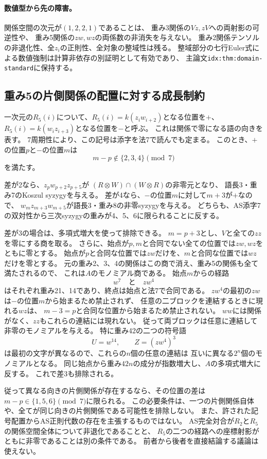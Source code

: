 \documentclass[11pt,a4paper]{ltjsarticle}
\begin{document}
\paragraph{数値型から先の障害。}
関係空間の次元が$(1,2,2,1)$であることは、
重み3関係の$Vz,zV$への両射影の可逆性や、
重み5関係の$zw,wz$の両係数の非消失を与えない。
重み2関係テンソルの非退化性、全$z_i$の正則性、全対象の整域性は残る。
整域部分の七行Euler式による数値強制は計算非依存の別証明として有効であり、
主論文\texttt{idx:thm:domain-standard}に保持する。

\subsection{重み5の片側関係の配置に対する成長制約}
\label{note:r5-orientation}
一次元の$R_5(i)$について、$R_5(i)=k(z_iw_{i+2})$となる位置を$+$、
$R_5(i)=k(w_iz_{i+3})$となる位置を$-$と呼ぶ。
これは関係で零になる語の向きを表す。
7周期性により、この記号は添字を法7で読んでも定まる。
このとき、$+$の位置$p$と$-$の位置$m$は
\[
m-p\notin\{2,3,4\}\pmod7
\]
を満たす。

差が2なら、$z_pw_{p+2}z_{p+5}$が
$(R\otimes W)\cap(W\otimes R)$の非零元となり、
語長3・重み7のKoszul syzygyを与える。
差が4なら、$-$の位置$m$に対して$m+3$が$+$なので、
$w_mz_{m+3}w_{m+5}$が語長3・重み8の非零syzygyを与える。
どちらも、AS添字7の双対性から三次syzygyの重みが4、5、6に限られることに反する。

差が3の場合は、多項式増大を使って排除できる。
$m=p+3$とし、$V$と全ての$zz$を零にする商を取る。
さらに、始点が$p,m$と合同でない全ての位置では$zw,wz$をともに零とする。
始点が$p$と合同な位置では$zw$だけを、$m$と合同な位置では$wz$だけを零とする。
元の重み2、3、4の関係はこの商で消え、重み5の関係も全て満たされるので、
これは$A$のモノミアル商である。
始点$m$からの経路
\[
w^7\quad\text{と}\quad zw^4
\]
はそれぞれ重み21、14であり、終点は始点と法7で合同である。
$zw^4$の最初の$zw$は$-$の位置$m$から始まるため禁止されず、
任意の二ブロックを連結するときに現れる$wz$は、
$m-3=p$と合同な位置から始まるため禁止されない。
$ww$には関係がなく、$zz$もこれらの連結には現れない。
従って両ブロックは任意に連結して非零のモノミアルを与える。
特に重み42の二つの符号語
\[
U=w^{14},\qquad Z=(zw^4)^3
\]
は最初の文字が異なるので、これらの$n$個の任意の連結は
互いに異なる$2^n$個のモノミアルとなる。
同じ始点から重み$42n$の成分が指数増大し、$A$の多項式増大に反する。
これで差3も排除される。

従って異なる向きの片側関係が存在するなら、その位置の差は
$m-p\in\{1,5,6\}\pmod7$に限られる。
この必要条件は、一つの片側関係自体や、全てが同じ向きの片側関係である可能性を排除しない。
また、許された記号配置からAS正則代数の存在を主張するものではない。
AS完全対合が$R_2$と$R_5$の関係空間全体について非退化であることと、
$R_5$の二つの経路への座標射影がともに非零であることは別の条件である。
前者から後者を直接結論する議論は使えない。
\end{document}
